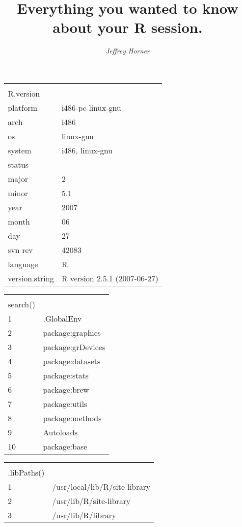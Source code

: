 \documentclass[a4paper]{article}
\title{Everything you wanted to know about your R session.}
\author{\emph{Jeffrey Horner}}
\begin{document}
\maketitle


\begin{tabular} {ll}
 & \\
R.version & \\
\hline
platform & i486-pc-linux-gnu \\
arch & i486 \\
os & linux-gnu \\
system & i486, linux-gnu \\
status &  \\
major & 2 \\
minor & 5.1 \\
year & 2007 \\
month & 06 \\
day & 27 \\
svn rev & 42083 \\
language & R \\
version.string & R version 2.5.1 (2007-06-27) \\

\hline
\end{tabular}

\begin{tabular} {ll}
 & \\
search() & \\
\hline
1 & .GlobalEnv \\
2 & package:graphics \\
3 & package:grDevices \\
4 & package:datasets \\
5 & package:stats \\
6 & package:brew \\
7 & package:utils \\
8 & package:methods \\
9 & Autoloads \\
10 & package:base \\

\hline
\end{tabular}

\begin{tabular} {ll}
 & \\
.libPaths() & \\
\hline
1 & /usr/local/lib/R/site-library \\
2 & /usr/lib/R/site-library \\
3 & /usr/lib/R/library \\

\hline
\end{tabular}
\end{document}
